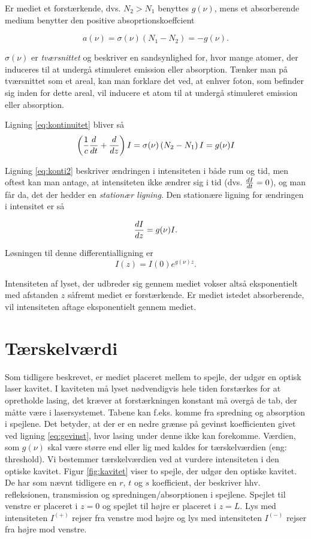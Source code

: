 Er mediet et forstærkende, dvs. $N_2>N_1$ benyttes $g(\nu)$, mens et absorberende medium benytter den positive absoprtionskoeffcient 

\begin{equation}
a(\nu) = \sigma(\nu)(N_1-N_2) = -g(\nu). 
\end{equation}

$\sigma(\nu)$ er \emph{tværsnittet} og beskriver en sandsynlighed for, hvor mange atomer, der induceres til at undergå stimuleret emission eller absorption. Tænker man på tværsnittet som et areal, kan man forklare det ved, at enhver foton, som befinder sig inden for dette areal, vil inducere et atom til at undergå stimuleret emission eller absorption. 

Ligning \ref{eq:kontinuitet} bliver så 
\begin{equation}
\left(\frac{1}{c} {d{} \over d{t}} + {d{} \over d{z}}\right)I = \sigma(\nu)\left(N_2-N_1\right)I = g(\nu)I
\label{eq:konti2}
\end{equation}

Ligning \ref{eq:konti2} beskriver ændringen i intensiteten i både rum og tid, men oftest kan man antage, at intensiteten ikke ændrer sig i tid (dvs. ${d{I} \over d{t}} = 0$), og man får da, det der hedder en \emph{stationær ligning}. Den stationære ligning for ændringen i intensitet er så 

\begin{equation}
{d{I} \over d{z}} = g(\nu)I. 
\label{I_diff}
\end{equation}

Løsningen til denne differentialligning er 
\begin{equation}
I(z) = I(0)e^{g(\nu)z}. 
\label{I_losning}
\end{equation}

Intensiteten af lyset, der udbreder sig gennem mediet vokser altså eksponentielt med afstanden $z$ såfremt mediet er forstærkende. Er mediet istedet absorberende, vil intensiteten aftage eksponentielt gennem mediet. 


\section{Tærskelværdi}
Som tidligere beskrevet, er mediet placeret mellem to spejle, der udgør en optisk laser kavitet. I kaviteten må lyset nødvendigvis hele tiden forstærkes for at opretholde lasing, det kræver at forstærkningen konstant må overgå de tab, der måtte være i lasersystemet. Tabene kan f.eks. komme fra spredning og absorption i spejlene. Det betyder, at der er en nedre grænse på gevinst koefficienten givet ved ligning \ref{eq:gevinst}, hvor lasing under denne ikke kan forekomme. Værdien, som $g(\nu)$ skal være større end eller lig med kaldes for tærskelværdien (eng: threshold). 
Vi bestemmer tærskelværdien ved at vurdere intensiteten i den optiske kavitet. Figur \ref{fig:kavitet} viser to spejle, der udgør den optiske kavitet. De har som nævnt tidligere en $r$, $t$ og $s$ koefficient, der beskriver hhv. refleksionen, transmission og spredningen/absorptionen i spejlene. Spejlet til venstre er placeret i $z=0$ og spejlet til højre er placeret i $z=L$. Lys med intensiteten $I^{(+)}$ rejser fra venstre mod højre og lys med intensiteten $I^{(-)}$ rejser fra højre mod venstre. 

